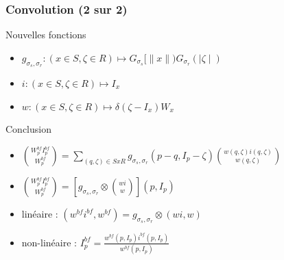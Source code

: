 \documentclass[compress]{beamer}
\begin{document}
\begin{frame}\frametitle{Convolution (2 sur 2)}
	\begin{block}{Nouvelles fonctions}
		\begin{itemize}
			\item $g_{\sigma_s ,\sigma_r} : (x\in S, \zeta \in R) \mapsto G_{\sigma_s}[\parallel x \parallel)G_{\sigma_r}(\mid \zeta \mid)$
			\item $i : (x\in S, \zeta \in R) \mapsto I_x$ 
			\item $w : (x\in S, \zeta \in R) \mapsto \delta(\zeta - I_x)W_x$
		\end{itemize}
	\end{block}		
\pause
	\begin{block}{Conclusion}
		\begin{itemize}
		\item $\binom{W_p^{bf} I_p^{bf}}{W_p^{bf}} = \sum_{(q,\zeta)\in SxR} g_{\sigma_s ,\sigma_r}(p-q, I_p -\zeta)\binom{w(q,\zeta)i(q,\zeta)}{w(q,\zeta)}$
		\item $\binom{W_p^{bf} I_p^{bf}}{W_p^{bf}} = \left[ g_{\sigma_s ,\sigma_r} \otimes \binom{wi}{w}\right] (p,I_p)$
		\item linéaire : $(w^{bf}i^{bf}, w^{bf}) = g_{\sigma_s ,\sigma_r} \otimes (wi,w)$
		\item non-linéaire : $I_p^{bf} = \frac{w^{bf}(p,I_p)i^{bf}(p,I_p)}{w^{bf}(p,I_p)}$
		\end{itemize}
	
	\end{block}
	
\end{frame}
\end{document}
